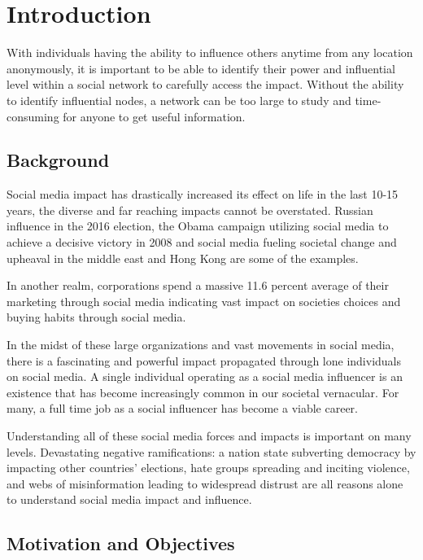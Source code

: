 \documentclass[11pt,twocolumn]{article}
\begin{document}
\section{Introduction}

With individuals having the ability to influence others anytime from any location anonymously, it is important to be able to identify their power and influential level within a social network to carefully access the impact. Without the ability to identify influential nodes, a network can be too large to study and time-consuming for anyone to get useful information.    


\subsection{Background}

Social media impact has drastically increased its effect on life in the last 10-15 years, the diverse and far reaching impacts cannot be overstated. Russian influence in the 2016 election, the Obama campaign utilizing social media to achieve a decisive victory in 2008 and social media fueling societal change and  upheaval in the middle east and Hong Kong are some of the examples. 

In another realm, corporations spend a massive 11.6 percent \cite{social-media-pricing} average of their marketing through social media indicating vast impact on societies choices and buying habits through social media.  

In the midst of these large organizations and vast movements in social media, there is a fascinating and powerful impact propagated through lone individuals on social media.  A single individual operating as a social media influencer is an existence that has become increasingly common in our societal vernacular. For many, a full time job as a social influencer has become a viable career. 

Understanding all of these social media forces and impacts is important on many levels. Devastating negative ramifications: a nation state subverting democracy by impacting other countries’ elections, hate groups spreading and inciting violence, and webs of misinformation leading to widespread distrust are all reasons alone to understand social media impact and influence. 

\subsection{Motivation and Objectives}
\end{document}
